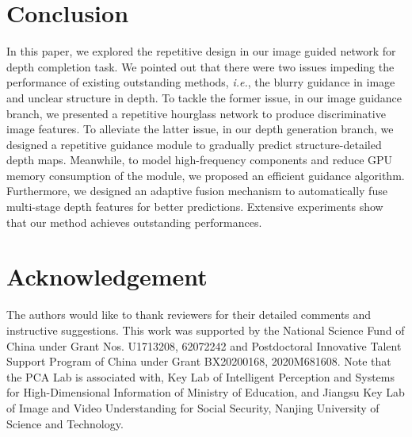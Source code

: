 \documentclass[runningheads]{llncs}
\begin{document}
\section{Conclusion}
In this paper, we explored the repetitive design in our image guided network for depth completion task. We pointed out that there were two issues impeding the performance of existing outstanding methods, \emph{i.e.}, the blurry guidance in image and unclear structure in depth. To tackle the former issue, in our image guidance branch, we presented a repetitive hourglass network to produce discriminative image features. To alleviate the latter issue, in our depth generation branch, we designed a repetitive guidance module to gradually predict structure-detailed depth maps. Meanwhile, to model high-frequency components and reduce GPU memory consumption of the module, we proposed an efficient guidance algorithm. Furthermore, we designed an adaptive fusion mechanism to automatically fuse multi-stage depth features for better predictions. Extensive experiments show that our method achieves outstanding performances.

\section{Acknowledgement}
The authors would like to thank reviewers for their detailed comments and instructive suggestions. This work was supported by the National Science Fund of China under Grant Nos. U1713208, 62072242 and Postdoctoral Innovative Talent Support Program of China under Grant BX20200168, 2020M681608. Note that the PCA Lab is associated with, Key Lab of Intelligent Perception and Systems for High-Dimensional Information of Ministry of Education, and Jiangsu Key Lab of Image and Video Understanding for Social Security, Nanjing University of Science and Technology.






\end{document}

